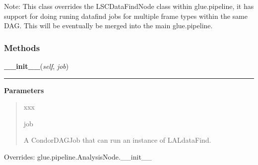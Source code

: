 Note: This class overrides the LSCDataFindNode class within 
glue.pipeline, it has support for doing runing datafind jobs for multiple 
frame types within the same DAG. This will be eventually be merged into 
the main glue.pipeline.



  \subsubsection{Methods}

    \label{stochastic:LSCDataFindNode:__init__}
    \vspace{0.5ex}

    \begin{boxedminipage}{\textwidth}

    \raggedright \textbf{\_\_init\_\_}(\textit{self}, \textit{job})

    \vspace{-1.5ex}

    \rule{\textwidth}{0.5\fboxrule}
    \vspace{1ex}

      \textbf{Parameters}
      \begin{quote}
        \begin{Ventry}{xxx}

          \item[job]

          A CondorDAGJob that can run an instance of LALdataFind.

        \end{Ventry}

      \end{quote}

    \vspace{1ex}

      Overrides: glue.pipeline.AnalysisNode.\_\_init\_\_

    \end{boxedminipage}

    \label{stochastic:LSCDataFindNode:get_output}
    \vspace{0.5ex}


